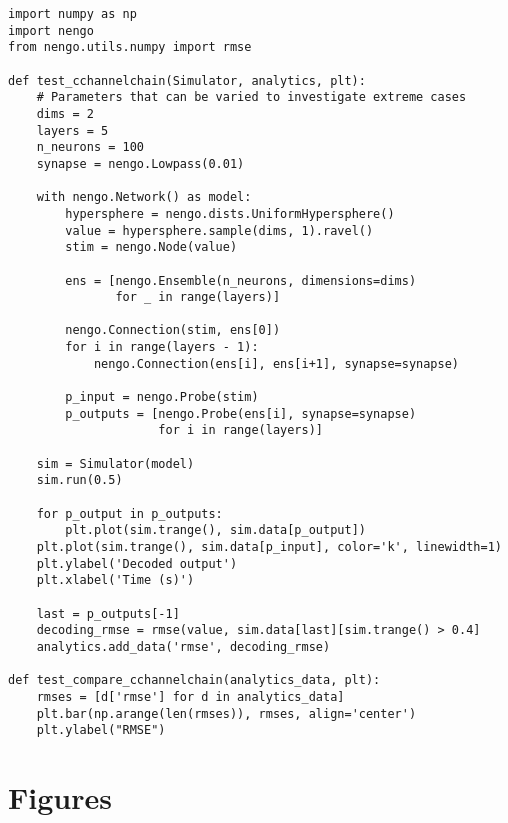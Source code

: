 \documentclass{frontiersSCNS}
\begin{document}
\begin{lstlisting}
import numpy as np
import nengo
from nengo.utils.numpy import rmse

def test_cchannelchain(Simulator, analytics, plt):
    # Parameters that can be varied to investigate extreme cases
    dims = 2
    layers = 5
    n_neurons = 100
    synapse = nengo.Lowpass(0.01)

    with nengo.Network() as model:
        hypersphere = nengo.dists.UniformHypersphere()
        value = hypersphere.sample(dims, 1).ravel()
        stim = nengo.Node(value)

        ens = [nengo.Ensemble(n_neurons, dimensions=dims)
               for _ in range(layers)]

        nengo.Connection(stim, ens[0])
        for i in range(layers - 1):
            nengo.Connection(ens[i], ens[i+1], synapse=synapse)

        p_input = nengo.Probe(stim)
        p_outputs = [nengo.Probe(ens[i], synapse=synapse)
                     for i in range(layers)]

    sim = Simulator(model)
    sim.run(0.5)

    for p_output in p_outputs:
        plt.plot(sim.trange(), sim.data[p_output])
    plt.plot(sim.trange(), sim.data[p_input], color='k', linewidth=1)
    plt.ylabel('Decoded output')
    plt.xlabel('Time (s)')

    last = p_outputs[-1]
    decoding_rmse = rmse(value, sim.data[last][sim.trange() > 0.4]
    analytics.add_data('rmse', decoding_rmse)

def test_compare_cchannelchain(analytics_data, plt):
    rmses = [d['rmse'] for d in analytics_data]
    plt.bar(np.arange(len(rmses)), rmses, align='center')
    plt.ylabel("RMSE")
\end{lstlisting}

\clearpage

\section*{Figures}
\end{document}
